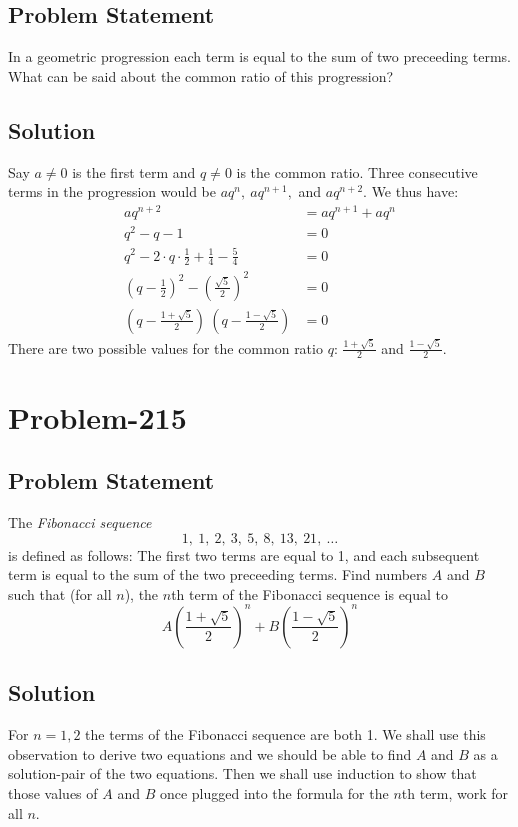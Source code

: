 \documentclass[12pt]{article}
\begin{document}
\subsection*{Problem Statement}
In a geometric progression each term is equal to the sum of two preceeding terms. What can be said about the common ratio of this progression?

\subsection*{Solution}
Say $a \neq 0$ is the first term and $q \neq 0$ is the common ratio. Three consecutive terms in the progression would be $aq^n,\ aq^{n+1},$ and $aq^{n+2}$. We thus have:
\begin{equation*}
	\begin{aligned}
		aq^{n+2} &= aq^{n+1} + aq^{n}\\
		q^2 - q - 1 &= 0\\
		q^2 - 2 \cdot q \cdot \frac{1}{2} + \frac{1}{4} - \frac{5}{4} &= 0\\
		\left(q - \frac{1}{2}\right)^2 - \left( \frac{\sqrt{5}}{2} \right)^2 &= 0\\
		\left( q - \frac{1+\sqrt{5}}{2} \right)\ \left( q - \frac{1-\sqrt{5}}{2} \right) &= 0
	\end{aligned}
\end{equation*}
There are two possible values for the common ratio $q$: $\frac{1+\sqrt{5}}{2}$ and $\frac{1-\sqrt{5}}{2}$.

\section*{Problem-215}
\subsection*{Problem Statement}
The \emph{Fibonacci sequence}
\[
	1,\ 1,\ 2,\ 3,\ 5,\ 8,\ 13,\ 21,\ \ldots
\]
is defined as follows: The first two terms are equal to 1, and each subsequent term is equal to the sum of the two preceeding terms. Find numbers $A$ and $B$ such that (for all $n$), the $n$th term of the Fibonacci sequence is equal to
\[
	A \left( \frac{1+\sqrt{5}}{2} \right)^n + B \left( \frac{1-\sqrt{5}}{2} \right)^n
\]

\subsection*{Solution}
For $n=1,2$ the terms of the Fibonacci sequence are both 1. We shall use this observation to derive two equations and we should be able to find $A$ and $B$ as a solution-pair of the two equations. Then we shall use induction to show that those values of $A$ and $B$ once plugged into the formula for the $n$th term, work for all $n$.
\end{document}
